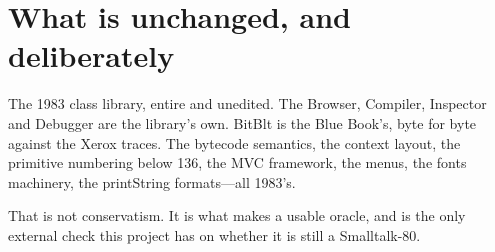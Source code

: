 \section{What is unchanged, and deliberately}

The 1983 class library, entire and unedited. The Browser, Compiler, Inspector
and Debugger are the library's own. BitBlt is the Blue Book's, byte for byte
against the Xerox traces. The bytecode semantics, the context layout, the
primitive numbering below 136, the MVC framework, the menus, the fonts
machinery, the printString formats---all 1983's.

That is not conservatism. It is what makes  a usable oracle, and
 is the only external check this project has on whether it is still
a Smalltalk-80.
